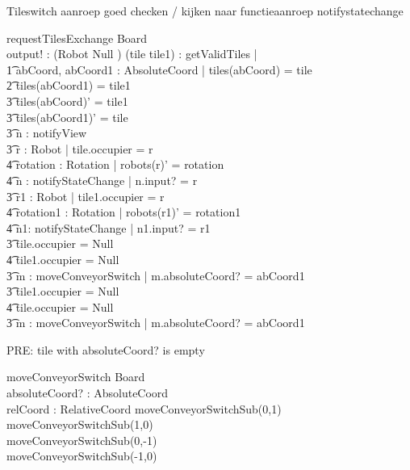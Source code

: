 \documentclass[a4paper,11pt]{article}
\begin{document}
Tileswitch aanroep goed checken / kijken naar functieaanroep notifystatechange
\begin{schema}{requestTilesExchange}
\Delta Board \\
output! : ({Robot \union Null} )
\where
\exists (tile \cross tile1) : getValidTiles | \\ \t1
\exists abCoord, abCoord1 : AbsoluteCoord | tiles(abCoord) = tile \\ \t2
tiles(abCoord1) = tile1 \implies \\ \t3
tiles(abCoord)' = tile1 \\ \t3
tiles(abCoord1)' = tile \\ \t3
\exists n : notifyView \\ \t3
\exists r : Robot | tile.occupier = r \implies \\ \t4
\exists rotation : Rotation | robots(r)' = rotation \\ \t4
\exists n : notifyStateChange | n.input? = r \\ \t3
\exists r1 : Robot | tile1.occupier = r \implies \\ \t4
\exists rotation1 : Rotation | robots(r1)' = rotation1 \\ \t4
\exists n1: notifyStateChange | n1.input? = r1 \\ \t3
\IF tile.occupier = Null \\ \t4
tile1.occupier \not = Null\\ \t3
\THEN \exists m : moveConveyorSwitch | m.absoluteCoord? = abCoord1 \\ \t3
\IF tile1.occupier = Null \\ \t4
tile.occupier \not = Null \\ \t3
\THEN \exists m : moveConveyorSwitch | m.absoluteCoord? = abCoord1
\end{schema}

PRE: tile with absoluteCoord? is empty
\begin{schema}{moveConveyorSwitch}
\Delta Board \\
absoluteCoord? : AbsoluteCoord \\
relCoord : RelativeCoord
\where
moveConveyorSwitchSub(0,1) \\
moveConveyorSwitchSub(1,0) \\
moveConveyorSwitchSub(0,-1) \\
moveConveyorSwitchSub(-1,0) \\
\end{schema}
\end{document}
